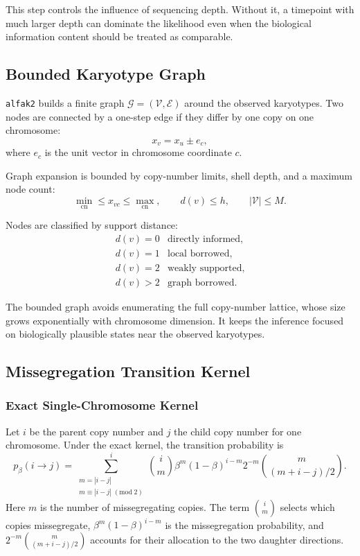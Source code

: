 \documentclass[11pt]{article}
\begin{document}
This step controls the influence of sequencing depth. Without it, a timepoint
with much larger depth can dominate the likelihood even when the biological
information content should be treated as comparable.

\subsection{Bounded Karyotype Graph}
\label{sec:s-graph}

\texttt{alfak2} builds a finite graph
$\mathcal{G}=(\mathcal{V},\mathcal{E})$ around the observed karyotypes.
Two nodes are connected by a one-step edge if they differ by one copy on one
chromosome:
\[
  x_v = x_u \pm e_c,
\]
where $e_c$ is the unit vector in chromosome coordinate $c$.

Graph expansion is bounded by copy-number limits, shell depth, and a maximum
node count:
\[
  \min_{\mathrm{cn}} \le x_{vc} \le \max_{\mathrm{cn}},
  \qquad
  d(v) \le h,
  \qquad
  |\mathcal{V}| \le M.
\]

Nodes are classified by support distance:
\[
\begin{array}{ll}
d(v)=0 & \text{directly informed},\\
d(v)=1 & \text{local borrowed},\\
d(v)=2 & \text{weakly supported},\\
d(v)>2 & \text{graph borrowed}.
\end{array}
\]

The bounded graph avoids enumerating the full copy-number lattice, whose size
grows exponentially with chromosome dimension. It keeps the inference focused
on biologically plausible states near the observed karyotypes.

\subsection{Missegregation Transition Kernel}
\label{sec:kernel}

\subsubsection{Exact Single-Chromosome Kernel}

Let $i$ be the parent copy number and $j$ the child copy number for one
chromosome. Under the exact kernel, the transition probability is
\[
  p_{\beta}(i \to j)
  =
  \sum_{\substack{m=|i-j|\\m\equiv |i-j|\;(\mathrm{mod}\;2)}}^{i}
  \binom{i}{m}
  \beta^m(1-\beta)^{i-m}
  2^{-m}
  \binom{m}{(m+i-j)/2}.
\]
Here $m$ is the number of missegregating copies. The term
$\binom{i}{m}$ selects which copies missegregate,
$\beta^m(1-\beta)^{i-m}$ is the missegregation probability, and
$2^{-m}\binom{m}{(m+i-j)/2}$ accounts for their allocation to the two
daughter directions.
\end{document}

